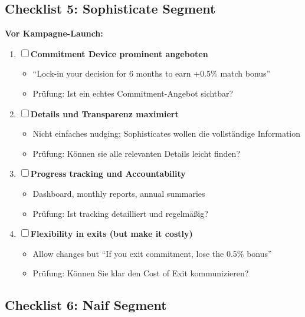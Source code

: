 \subsection{Checklist 5: Sophisticate Segment}

\begin{tcolorbox}[colback=blue!5!white, colframe=blue!75!black, title=\textbf{Deployment Checklist: Sophisticate}]

\textbf{Vor Kampagne-Launch:}
\begin{enumerate}[label=\textbf{SP-\arabic*}]
\item ☐ \textbf{Commitment Device prominent angeboten}
  \begin{itemize}[nosep]
  \item ``Lock-in your decision for 6 months to earn +0.5\% match bonus''
  \item Prüfung: Ist ein echtes Commitment-Angebot sichtbar?
  \end{itemize}

\item ☐ \textbf{Details und Transparenz maximiert}
  \begin{itemize}[nosep]
  \item Nicht einfaches nudging; Sophisticates wollen die vollständige Information
  \item Prüfung: Können sie alle relevanten Details leicht finden?
  \end{itemize}

\item ☐ \textbf{Progress tracking und Accountability}
  \begin{itemize}[nosep]
  \item Dashboard, monthly reports, annual summaries
  \item Prüfung: Ist tracking detailliert und regelmäßig?
  \end{itemize}

\item ☐ \textbf{Flexibility in exits (but make it costly)}
  \begin{itemize}[nosep]
  \item Allow changes but ``If you exit commitment, lose the 0.5\% bonus''
  \item Prüfung: Können Sie klar den Cost of Exit kommunizieren?
  \end{itemize}
\end{enumerate}

\end{tcolorbox}

\subsection{Checklist 6: Naif Segment}

